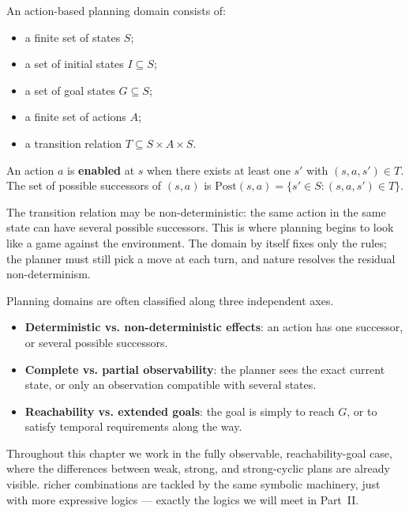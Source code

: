 \begin{definition}
\label{def:planning-domain}
An action-based planning domain consists of:
\begin{itemize}[nosep]
  \item a finite set of states $S$;
  \item a set of initial states $I\subseteq S$;
  \item a set of goal states $G\subseteq S$;
  \item a finite set of actions $A$;
  \item a transition relation $T\subseteq S\times A\times S$.
\end{itemize}
An action $a$ is \textbf{enabled} at $s$ when there exists at least one
$s'$ with $(s,a,s')\in T$.  The set of possible successors of $(s,a)$
is $\mathrm{Post}(s,a)=\{s'\in S:(s,a,s')\in T\}$.
\end{definition}

The transition relation may be non-deterministic: the same action in
the same state can have several possible successors.  This is where
planning begins to look like a game against the environment.  The
domain by itself fixes only the rules; the planner must still pick a
move at each turn, and nature resolves the residual non-determinism.

\begin{formaldetails}
Planning domains are often classified along three independent axes.
\begin{itemize}[nosep]
  \item \textbf{Deterministic vs. non-deterministic effects}: an action
        has one successor, or several possible successors.
  \item \textbf{Complete vs. partial observability}: the planner sees
        the exact current state, or only an observation compatible with
        several states.
  \item \textbf{Reachability vs. extended goals}: the goal is simply to
        reach $G$, or to satisfy temporal requirements along the way.
\end{itemize}
Throughout this chapter we work in the fully observable,
reachability-goal case, where the differences between weak, strong, and
strong-cyclic plans are already visible.  richer combinations are
tackled by the same symbolic machinery, just with more expressive
logics --- exactly the logics we will meet in Part~II.
\end{formaldetails}

